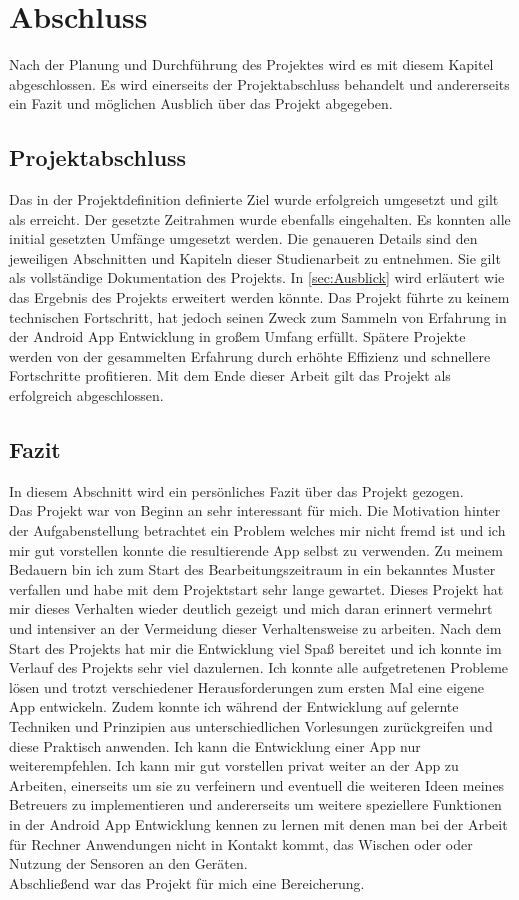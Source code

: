 \chapter{Abschluss}\label{chpt:schluss}
Nach der Planung und Durchführung des Projektes wird es mit diesem Kapitel abgeschlossen. Es wird einerseits der Projektabschluss behandelt und andererseits ein Fazit und möglichen Ausblich über das Projekt abgegeben.

\section{Projektabschluss}\label{sec:projektschluss}
Das in der Projektdefinition definierte Ziel wurde erfolgreich umgesetzt und gilt als erreicht. Der gesetzte Zeitrahmen wurde ebenfalls eingehalten. Es konnten alle initial gesetzten Umfänge umgesetzt werden. Die genaueren Details sind den jeweiligen Abschnitten und Kapiteln dieser Studienarbeit zu entnehmen. Sie gilt als vollständige Dokumentation des Projekts.
In \autoref{sec:Ausblick} wird erläutert wie das Ergebnis des Projekts erweitert werden könnte. Das Projekt führte zu keinem technischen Fortschritt, hat jedoch seinen Zweck zum Sammeln von Erfahrung in der Android App Entwicklung in großem Umfang erfüllt. Spätere Projekte werden von der gesammelten Erfahrung durch erhöhte Effizienz und schnellere Fortschritte profitieren. Mit dem Ende dieser Arbeit gilt das Projekt als erfolgreich abgeschlossen.

\section{Fazit}\label{sec:fazit}
In diesem Abschnitt wird ein persönliches Fazit über das Projekt gezogen.\\
Das Projekt war von Beginn an sehr interessant für mich. Die Motivation hinter der Aufgabenstellung betrachtet ein Problem welches mir nicht fremd ist und ich mir gut vorstellen konnte die resultierende App selbst zu verwenden. Zu meinem Bedauern bin ich zum Start des Bearbeitungszeitraum in ein bekanntes Muster verfallen und habe mit dem Projektstart sehr lange gewartet. Dieses Projekt hat mir dieses Verhalten wieder deutlich gezeigt und mich daran erinnert vermehrt und intensiver an der Vermeidung dieser Verhaltensweise zu arbeiten. Nach dem Start des Projekts hat mir die Entwicklung viel Spaß bereitet und ich konnte im Verlauf des Projekts sehr viel dazulernen. Ich konnte alle aufgetretenen Probleme lösen und trotzt verschiedener Herausforderungen zum ersten Mal eine eigene App entwickeln. Zudem konnte ich während der Entwicklung auf gelernte Techniken und Prinzipien aus unterschiedlichen Vorlesungen zurückgreifen und diese Praktisch anwenden. Ich kann die Entwicklung einer App nur weiterempfehlen. Ich kann mir gut vorstellen privat weiter an der App zu Arbeiten, einerseits um sie zu verfeinern und eventuell die weiteren Ideen meines Betreuers zu implementieren und andererseits um weitere speziellere Funktionen in der Android App Entwicklung kennen zu lernen mit denen man bei der Arbeit für Rechner Anwendungen nicht in Kontakt kommt, \zB das Wischen oder oder Nutzung der Sensoren an den Geräten.\\
Abschließend war das Projekt für mich eine Bereicherung.

